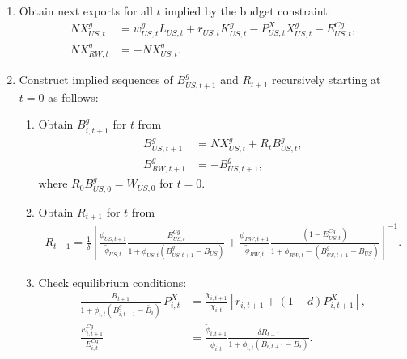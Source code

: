 \documentclass{article}
\begin{document}
\begin{itemize}
\begin{enumerate}
        \item Obtain next exports for all $t$ implied by the budget constraint:
            \begin{align*}
                NX_{US,t}^{g} & = w_{US,t}^{g}L_{US,t} + r_{US,t}K_{US,t}^{g} - P^X_{US,t}X_{US,t}^{g} - E_{US,t}^{Cg}, \\
                NX_{RW,t}^{g} & = -NX_{US,t}^{g}.
            \end{align*}

        \item Construct implied sequences of $B_{US,t+1}^{g}$ and $R_{t+1}$ recursively starting at $t=0$ as follows:
        \begin{enumerate}            
            \item Obtain $B_{i,t+1}^{g}$ for $t$ from
            \begin{align*}
                B_{US,t+1}^{g} & = NX_{US,t}^{g} + R_{t}B_{US,t}^{g}, \\
                B_{RW,t+1}^{g} & = - B_{US,t+1}^{g},
            \end{align*}
            where $R_{0} B_{US,0}^{g} = W_{US,0}$ for $t=0$.

            \item Obtain $R_{t+1}$ for $t$ from
            \begin{align*}
                R_{t+1} = \frac{1}{\delta} \left[ \frac{\widetilde{\phi}_{US,t+1}}{\widetilde{\phi}_{US,t}} \frac{E_{US,t}^{Cg}}{1+\phi_{US,t} (B_{US,t+1}^{g} - \bar{B}_{US})}  + \frac{\widetilde{\phi}_{RW,t+1}}{\widetilde{\phi}_{RW,t}} \frac{\left( 1 - E_{US,t}^{Cg} \right)}{1+\phi_{RW,t} -(B_{US,t+1}^{g} - \bar{B}_{US})}  \right]^{-1}.
            \end{align*}

            \item Check equilibrium conditions:
            \begin{align}
                \frac{R_{t+1}}{1+\phi_{i,t}\left(B_{i,t+1}^{g}-\bar{B}_i\right)}\,P^X_{i,t} & = \frac{\chi_{i,t+1}}{\chi_{i,t}}\left[r_{i,t+1} + (1-d)P^X_{i,t+1}\right], \\
                \frac{E_{i,t+1}^{Cg}}{E_{i,t}^{Cg}} & = \frac{\widetilde{\phi}_{i,t+1}}{\widetilde{\phi}_{i,t}} \frac{\delta R_{t+1}}{1+\phi_{i,t} (B_{i,t+1} - \bar{B}_{i})}.
            \end{align}


        \end{enumerate}


        
    \end{enumerate}
\end{itemize}
\end{document}
